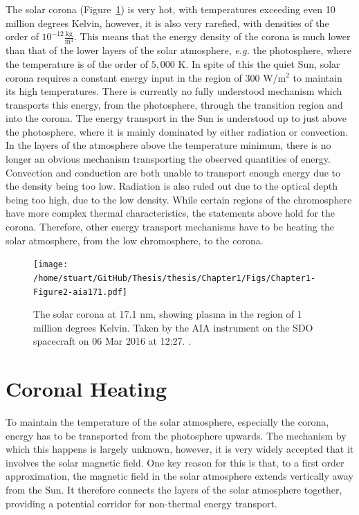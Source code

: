 \documentclass[a4paper,12pt,fourier,authoryear,custommargin]{Classes/PhDThesisPSnPDF}
\begin{document}
The solar corona (Figure~\ref{fig:aia171}) is very hot, with temperatures exceeding even 10 million degrees Kelvin, however, it is also very rarefied, with densities of the order of $10^{-12}$$\frac{\text{kg}}{\text{m}^3}$.
This means that the energy density of the corona is much lower than that of the lower layers of the solar atmosphere, \textit{e.g.} the photosphere, where the temperature is of the order of $5,000$ K.
In spite of this the quiet Sun, solar corona requires a constant energy input in the region of $300$ W/m$^2$ \citep{priest2014} to maintain its high temperatures.
There is currently no fully understood mechanism which transports this energy, from the photosphere, through the transition region and into the corona. \citep{aschwanden2007,erdelyi2007,parnell2012}
The energy transport in the Sun is understood up to just above the photosphere, where it is mainly dominated by either radiation or convection.
In the layers of the atmosphere above the temperature minimum, there is no longer an obvious mechanism transporting the observed quantities of energy.
Convection and conduction are both unable to transport enough energy due to the density being too low.
Radiation is also ruled out due to the optical depth being too high, due to the low density.
While certain regions of the chromosphere have more complex thermal characteristics, the statements above hold for the corona.
Therefore, other energy transport mechanisms have to be heating the solar atmosphere, from the low chromosphere, to the corona.




\begin{figure}[h]
    \centering
    \texttt{[image: /home/stuart/GitHub/Thesis/thesis/Chapter1/Figs/Chapter1-Figure2-aia171.pdf]}
    \caption{The solar corona at 17.1 nm, showing plasma in the region of 1 million degrees Kelvin. Taken by the AIA instrument on the SDO spacecraft on 06 Mar 2016 at 12:27. \citep{pesnell2012,thesunpycommunity2015a}.}
    \label{fig:aia171}
\end{figure}


\section{Coronal Heating}

To maintain the temperature of the solar atmosphere, especially the corona, energy has to be transported from the photosphere upwards.
The mechanism by which this happens is largely unknown, however, it is very widely accepted that it involves the solar magnetic field.
One key reason for this is that, to a first order approximation, the magnetic field in the solar atmosphere extends vertically away from the Sun.
It therefore connects the layers of the solar atmosphere together, providing a potential corridor for non-thermal energy transport.
\end{document}
